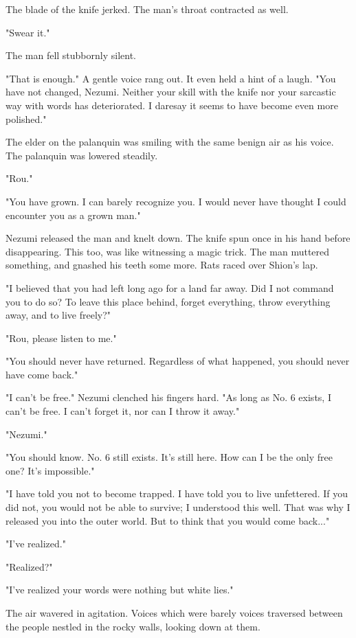 The blade of the knife jerked. The man's throat contracted as well.

"Swear it."

The man fell stubbornly silent.

"That is enough." A gentle voice rang out. It even held a hint of a
laugh. "You have not changed, Nezumi. Neither your skill with the knife
nor your sarcastic way with words has deteriorated. I daresay it seems
to have become even more polished."

The elder on the palanquin was smiling with the same benign air as his
voice. The palanquin was lowered steadily.

"Rou."

"You have grown. I can barely recognize you. I would never have thought
I could encounter you as a grown man."

Nezumi released the man and knelt down. The knife spun once in his hand
before disappearing. This too, was like witnessing a magic trick. The
man muttered something, and gnashed his teeth some more. Rats raced over
Shion's lap.

"I believed that you had left long ago for a land far away. Did I not
command you to do so? To leave this place behind, forget everything,
throw everything away, and to live freely?"

"Rou, please listen to me."

"You should never have returned. Regardless of what happened, you should
never have come back."

"I can't be free." Nezumi clenched his fingers hard. "As long as No. 6
exists, I can't be free. I can't forget it, nor can I throw it away."

"Nezumi."

"You should know. No. 6 still exists. It's still here. How can I be the
only free one? It's impossible."

"I have told you not to become trapped. I have told you to live
unfettered. If you did not, you would not be able to survive; I
understood this well. That was why I released you into the outer world.
But to think that you would come back..."

"I've realized."

"Realized?"

"I've realized your words were nothing but white lies."

The air wavered in agitation. Voices which were barely voices traversed
between the people nestled in the rocky walls, looking down at them.

